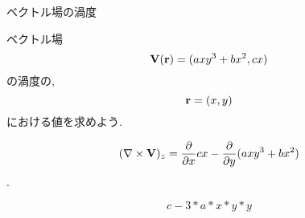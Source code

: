 \makeatletter  
{}%
\makeatother


 \begin{theme}{ベクトル場の渦度}
   \begin{memo}
   \end{memo}

  \begin{prob}
ベクトル場 $${\bf V}({\bf r})=({a}xy^3+{b}x^2,{c}x)$$ の渦度の, $${\bf r}=({x},{y})$$における値を求めよう.
  \end{prob}
  \begin{sol}
$$(\nabla\times{\bf V})_z=\frac{\partial}{\partial x} {c}x - \frac{\partial}{\partial y}({a}xy^3+{b}x^2)$$.
    \end{sol}
    \begin{ans}
$${c}-3*{a}*{x}*{y}*{y}$$      
    \end{ans}
\end{theme}




\makeatletter
{}
\makeatother

